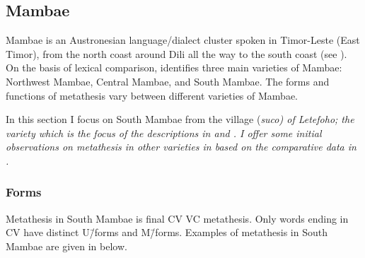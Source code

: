 

\subsection{Mambae}\label{sec:Mam} %
Mambae is an Austronesian language/dialect
cluster spoken in Timor-Leste (East Timor),
from the north coast around Dili all the way to the south coast (see ).
On the basis of lexical comparison, \citet{fo17}
identifies three main varieties of Mambae:
Northwest Mambae, Central Mambae, and South Mambae.
The forms and functions of metathesis
vary between different varieties of Mambae.

In this section I focus on South Mambae
from the village (\it{suco}) of Letefoho;
the variety which is the focus of the descriptions in \cite{gr14} and \cite{fo17}.
I offer some initial observations on metathesis in other varieties
in  based on the comparative data in \cite{fo17}.

\subsubsection{Forms}
Metathesis in South Mambae is final CV {\ra} VC metathesis.
Only words ending in CV have distinct U\=/forms and M\=/forms.
Examples of metathesis in South Mambae are given in  below.

